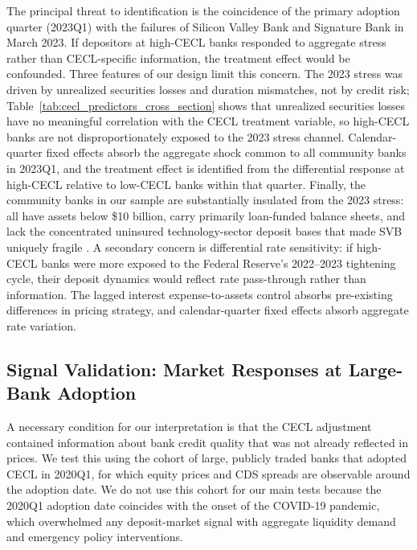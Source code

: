 The principal threat to identification is the coincidence of the primary
adoption quarter (2023Q1) with the failures of Silicon Valley Bank and
Signature Bank in March 2023.  If depositors at high-CECL banks responded
to aggregate stress rather than CECL-specific information, the treatment
effect would be confounded.  Three features of our design limit this concern.
The 2023 stress was driven by unrealized securities losses and duration
mismatches, not by credit risk; Table~\ref{tab:cecl_predictors_cross_section}
shows that unrealized securities losses have no meaningful correlation with
the CECL treatment variable, so high-CECL banks are not disproportionately
exposed to the 2023 stress channel.  Calendar-quarter fixed effects absorb
the aggregate shock common to all community banks in 2023Q1, and the
treatment effect is identified from the differential response at high-CECL
relative to low-CECL banks within that quarter.  Finally, the community banks
in our sample are substantially insulated from the 2023 stress: all have
assets below \$10 billion, carry primarily loan-funded balance sheets, and
lack the concentrated uninsured technology-sector deposit bases that made
SVB uniquely fragile \citep{jiang2024monetary}.  A secondary concern is
differential rate sensitivity: if high-CECL banks were more exposed to the
Federal Reserve's 2022--2023 tightening cycle, their deposit dynamics would
reflect rate pass-through rather than information.  The lagged interest
expense-to-assets control absorbs pre-existing differences in pricing
strategy, and calendar-quarter fixed effects absorb aggregate rate variation.

\subsection{Signal Validation: Market Responses at Large-Bank Adoption}
\label{sec:identification:signal}

A necessary condition for our interpretation is that the CECL adjustment
contained information about bank credit quality that was not already reflected
in prices.  We test this using the cohort of large, publicly traded banks that
adopted CECL in 2020Q1, for which equity prices and CDS spreads are observable
around the adoption date.  We do not use this cohort for
our main tests because the 2020Q1 adoption date coincides with the onset of
the COVID-19 pandemic, which overwhelmed any deposit-market signal with
aggregate liquidity demand and emergency policy interventions.

